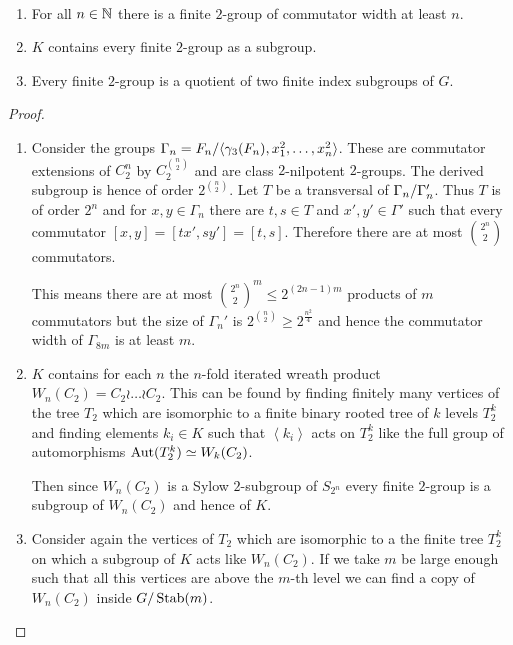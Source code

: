 \documentclass[a4paper,11pt]{amsart}
\begin{document}
\begin{pro}\ 
 \begin{enumerate}
  \item For all $n\in\mathbb{N}$ there is a finite $2$-group of commutator width at least $n$.
  \item $K$ contains every finite $2$-group as a subgroup.
  \item Every finite $2$-group is a quotient of two finite index subgroups of $G$.
 \end{enumerate}
\end{pro}
\begin{proof}\
 \begin{enumerate}
  \item Consider the groups $\Gamma_n={F_n/\langle \gamma_3(F_n),x_1^2,\dotsc,x_n^2\rangle}$. 
  These are commutator extensions of $C_2^n$ by $C_2^{\binom{n}{2}}$ and are class $2$-nilpotent $2$-groups.
  The derived subgroup is hence of order $2^{\binom{n}{2}}$.
  Let $T$ be a transversal of ${\Gamma_n/\Gamma_n'}$. Thus $T$ is of order $2^n$ and
  for $x,y\in\Gamma_n$ there are $t,s\in T$ and $x',y'\in\Gamma'$ such that
  every commutator $[x,y]=[tx',sy']=[t,s]$. Therefore there are at most $\binom{2^n}{2}$ commutators.
  
  This means there are at most $\binom{2^n}{2}^m\leq 2^{(2n-1)m}$ products of $m$ commutators 
  but the size of $\Gamma_n'$ is $2^{\binom{n}{2}} \geq2^{\frac{n^2}{4}}$ and hence 
  the commutator width of $\Gamma_{8m}$ is at least $m$.
  \item  $K$ contains for each $n$ the $n$-fold iterated wreath product
  $W_n(C_2)=C_2\wr \ldots \wr C_2$. 
  This can be found by finding finitely many vertices of the tree $T_2$ which
  are isomorphic to a finite binary rooted tree of $k$ levels $T_2^k$ and finding 
  elements $k_i\in K$ such that $\left<k_i\right>$ acts on $T_2^k$ like the full group of 
  automorphisms $\operatorname{{Aut}}(T_2^k)\simeq W_k(C_2)$.
  
  Then 
  since $W_n(C_2)$ is a Sylow $2$-subgroup of $S_{2^n}$ every finite $2$-group is a subgroup of
  $W_n(C_2)$ and hence of $K$.
  \item Consider again the vertices of $T_2$ which are isomorphic to a
  the finite tree $T_2^k$ on which a subgroup of $K$ acts like $W_n(C_2)$. If we take $m$ be large
  enough such that all this vertices are above the $m$-th level we can find a copy of $W_n(C_2)$
  inside ${G/\operatorname{Stab}(m)}$.
 \end{enumerate}
\end{proof}
\end{document}
